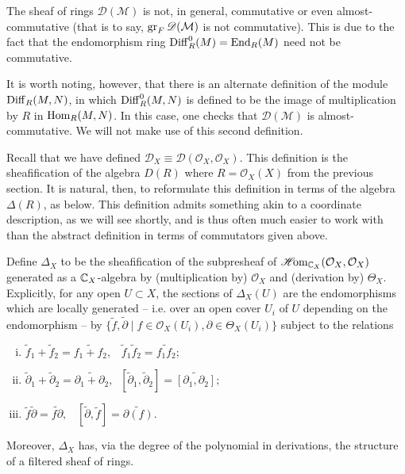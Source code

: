 \begin{remark}
    The sheaf of rings $\mathscr{D}(\mathcal{M})$ is not, in general, commutative or even
    almost-commutative (that is to say, $\operatorname{gr}_F \mathscr{D}(\mathcal{M})$ is not commutative).
    This is due to the fact that the endomorphism ring $\operatorname{Diff}_R^0(M)=\operatorname{End}_R(M)$ need not be
    commutative.

    It is worth noting, however, that there is an alternate definition of the module
    $\operatorname{Diff}_R(M,N)$, in which $\operatorname{Diff}^0_R(M,N)$ is defined to be the image of multiplication
    by $R$ in $\operatorname{Hom}_R(M,N)$. In this case, one checks that $\mathscr{D}(\mathcal{M})$ is
    almost-commutative. We will not make use of this second definition.
\end{remark}

Recall that we have defined $\mathscr{D}_X\equiv\mathscr{D}(\mathcal{O}_X,\mathcal{O}_X)$.
This definition is the sheafification of the algebra $D(R)$ where $R=\mathcal{O}_X(X)$ from
the previous section. It is natural, then, to reformulate this definition in terms of the
algebra $\Delta(R)$, as below. This definition admits something akin to a coordinate description,
as we will see shortly, and is thus often much easier to work with than the abstract definition
in terms of commutators given above.

\begin{definition}
    Define $\Delta_X$ to be the sheafification of the subpresheaf of $\operatorname{\mathscr{H}\!om}_{\mathbb{C}_X}(\mathcal{O}_X,\mathcal{O}_X)$
    generated as a $\mathbb{C}_X$-algebra by (multiplication by) $\mathcal{O}_X$ and (derivation by)
    $\Theta_X$. Explicitly, for any open $U\subset X$, the sections of $\Delta_X(U)$ are
    the endomorphisms which are locally generated -- i.e. over an open cover $U_i$ of $U$ depending
    on the endomorphism -- by 
    $\{\tilde f,\tilde \partial\mid f\in\mathcal{O}_X(U_i),\partial\in\Theta_X(U_i)\}$
    subject to the relations
    \begin{enumerate}[(i)]
        \item $\tilde f_1+\tilde f_2=\widetilde{f_1+f_2}, \;\;\; \tilde f_1\tilde f_2=\widetilde{f_1f_2};$
        \item $\tilde \partial_1 +\tilde \partial_2=\widetilde{\partial_1+\partial_2}, \;\; [\tilde\partial_1,\tilde\partial_2]=\widetilde{[\partial_1,\partial_2]};$
        \item $\tilde f\tilde \partial=\widetilde{f\partial}, \;\;\; [\tilde\partial,\tilde f]=\widetilde{\partial(f)}$.
    \end{enumerate}
    Moreover, $\Delta_X$ has, via the degree of the polynomial in derivations, the structure of a filtered
    sheaf of rings.
    \label{def:D_X2}
\end{definition}

